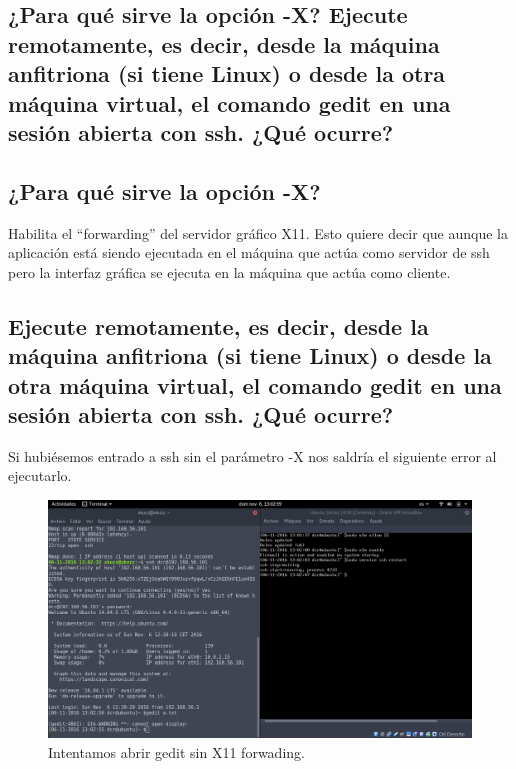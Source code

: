 \begin{flushleft}
\section{¿Para qué sirve la opción -X?  Ejecute remotamente, es decir, desde la máquina anfitriona (si tiene Linux) o desde la otra máquina virtual, el comando gedit en una sesión abierta con ssh. ¿Qué ocurre?}

\subsection{¿Para qué sirve la opción -X?}
Habilita el ``forwarding'' del servidor gráfico X11. Esto quiere decir que aunque la aplicación está siendo ejecutada en el máquina que actúa como servidor de ssh pero la interfaz gráfica se ejecuta en la máquina que actúa como cliente. \cite{c5a}

\subsection{Ejecute remotamente, es decir, desde la máquina anfitriona (si tiene Linux) o desde la otra máquina virtual, el comando gedit en una sesión abierta con ssh. ¿Qué ocurre?}
Si hubiésemos entrado a ssh sin el parámetro -X nos saldría el siguiente error al ejecutarlo.
\begin{figure}[H]
	\centering
	\includegraphics[scale=0.3]{gedit.png}
	\caption{Intentamos abrir gedit sin X11 forwading.}
\end{figure}


\end{flushleft}
